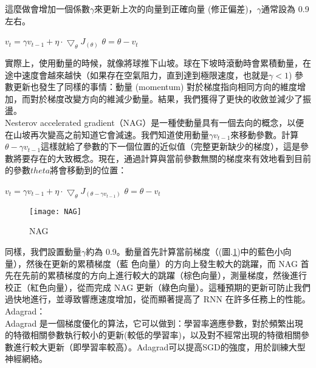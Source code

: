 \begin{itemize}
\begin{figure}[hbt!]
\begin{center}
\end{center}
\end{figure}
\newpage
這麼做會增加一個係數$\gamma$來更新上次的向量到正確向量 (修正偏差)，$\gamma$通常設為 0.9 左右。
\begin{center}
$v_t = \gamma v_{t-1}+\eta\cdot\bigtriangledown_{\theta}J_{(\theta)}$
$\theta = \theta-v_t$
\end{center}
 實際上，使用動量的時候，就像將球推下山坡。球在下坡時滾動時會累積動量，在途中速度會越來越快（如果存在空氣阻力，直到達到極限速度，也就是$\gamma < 1$) 參數更新也發生了同樣的事情：動量 (momentum) 對於梯度指向相同方向的維度增加，而對於梯度改變方向的維減少動量。結果，我們獲得了更快的收斂並減少了振盪。\\

 Nesterov accelerated gradient（NAG）是一種使動量具有一個去向的概念，以便在山坡再次變高之前知道它會減速。我們知道使用動量$\gamma v_{t-1}$來移動參數。計算$\theta - \gamma v_{t-1}$這樣就給了參數的下一個位置的近似值（完整更新缺少的梯度），這是參數將要存在的大致概念。現在，通過計算與當前參數無關的梯度來有效地看到目前的參數$theta$將會移動到的位置：
\begin{center}
$v_t = \gamma v_{t-1}+\eta\cdot\bigtriangledown_{\theta}J_{(\theta-\gamma v_{t-1})}$
$\theta = \theta - v_t$
\end{center}
\begin{figure}[hbt!]
\begin{center}
\texttt{[image: NAG]}
\caption{\Large NAG}
\label{NAG}
\end{center}
\end{figure}
\newpage
 同樣，我們設置動量$\gamma$約為 0.9。動量首先計算當前梯度（(圖.\ref{NAG})中的藍色小向量），然後在更新的累積梯度（藍 色向量）的方向上發生較大的跳躍，而 NAG 首先在先前的累積梯度的方向上進行較大的跳躍（棕色向量），測量梯度，然後進行校正（紅色向量），從而完成 NAG 更新（綠色向量）。這種預期的更新可防止我們過快地進行，並導致響應速度增加，從而顯著提高了 RNN 在許多任務上的性能。\\
Adagrad：\\
 Adagrad 是一個梯度優化的算法，它可以做到：學習率適應參數，對於頻繁出現的特徵相關參數執行較小的更新(較低的學習率)，以及對不經常出現的特徵相關參數進行較大更新（即學習率較高）。Adagrad可以提高SGD的強度，用於訓練大型神經網絡。\\
 

\end{itemize}
